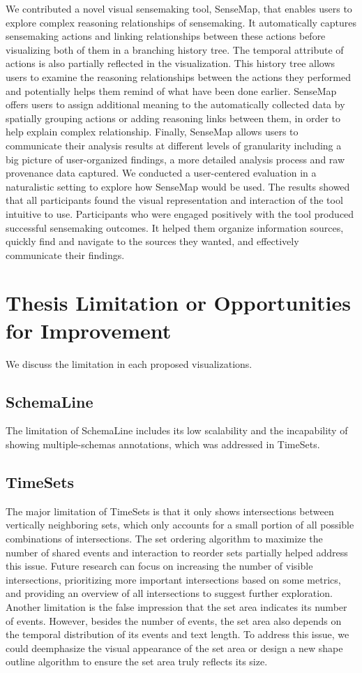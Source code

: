 We contributed a novel visual sensemaking tool, SenseMap, that enables users to explore complex reasoning relationships of sensemaking. It automatically captures sensemaking actions and linking relationships between these actions before visualizing both of them in a branching history tree. The temporal attribute of actions is also partially reflected in the visualization. This history tree allows users to examine the reasoning relationships between the actions they performed and potentially helps them remind of what have been done earlier. SenseMap offers users to assign additional meaning to the automatically collected data by spatially grouping actions or adding reasoning links between them, in order to help explain complex relationship. Finally, SenseMap allows users to communicate their analysis results at different levels of granularity including a big picture of user-organized findings, a more detailed analysis process and raw provenance data captured. We conducted a user-centered evaluation in a naturalistic setting to explore how SenseMap would be used. The results showed that all participants found the visual representation and interaction of the tool intuitive to use. Participants who were engaged positively with the tool produced successful sensemaking outcomes. It helped them organize information sources, quickly find and navigate to the sources they wanted, and effectively communicate their findings.

\section{Thesis Limitation or Opportunities for Improvement }
We discuss the limitation in each proposed visualizations.

\subsection{SchemaLine}
 The limitation of SchemaLine includes its low scalability and the incapability of showing multiple-schemas annotations, which was addressed in TimeSets.

\subsection{TimeSets}
The major limitation of TimeSets is that it only shows intersections between vertically neighboring sets, which only accounts for a small portion of all possible combinations of intersections. The set ordering algorithm to maximize the number of shared events and interaction to reorder sets partially helped address this issue. Future research can focus on increasing the number of visible intersections, prioritizing more important intersections based on some metrics, and providing an overview of all intersections to suggest further exploration. Another limitation is the false impression that the set area indicates its number of events. However, besides the number of events, the set area also depends on the temporal distribution of its events and text length. To address this issue, we could deemphasize the visual appearance of the set area or design a new shape outline algorithm to ensure the set area truly reflects its size.

